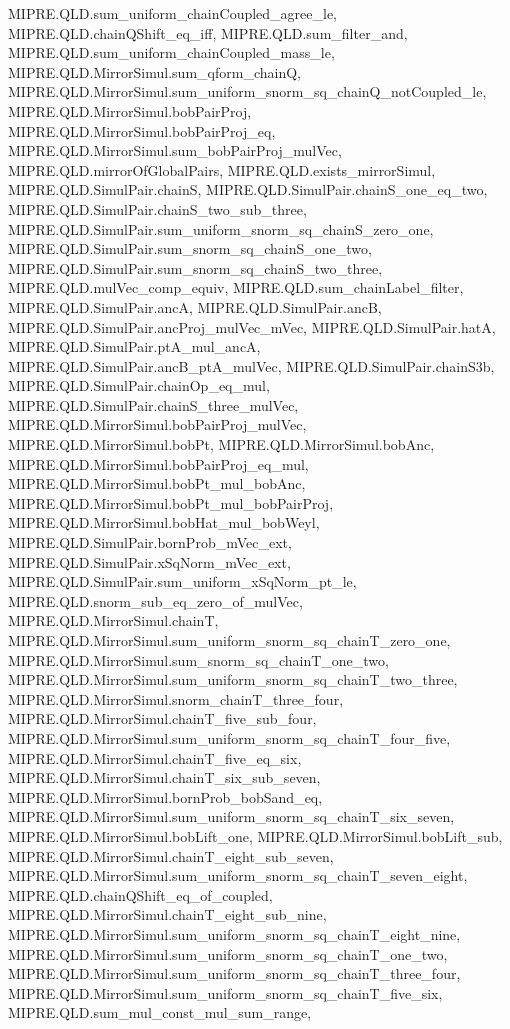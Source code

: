 \begin{lemma}
{  MIPRE.QLD.sum_uniform_chainCoupled_agree_le, MIPRE.QLD.chainQShift_eq_iff,
  MIPRE.QLD.sum_filter_and, MIPRE.QLD.sum_uniform_chainCoupled_mass_le,
  MIPRE.QLD.MirrorSimul.sum_qform_chainQ,
  MIPRE.QLD.MirrorSimul.sum_uniform_snorm_sq_chainQ_notCoupled_le,
  MIPRE.QLD.MirrorSimul.bobPairProj, MIPRE.QLD.MirrorSimul.bobPairProj_eq,
  MIPRE.QLD.MirrorSimul.sum_bobPairProj_mulVec, MIPRE.QLD.mirrorOfGlobalPairs,
  MIPRE.QLD.exists_mirrorSimul, MIPRE.QLD.SimulPair.chainS, MIPRE.QLD.SimulPair.chainS_one_eq_two,
  MIPRE.QLD.SimulPair.chainS_two_sub_three,
  MIPRE.QLD.SimulPair.sum_uniform_snorm_sq_chainS_zero_one,
  MIPRE.QLD.SimulPair.sum_snorm_sq_chainS_one_two,
  MIPRE.QLD.SimulPair.sum_snorm_sq_chainS_two_three, MIPRE.QLD.mulVec_comp_equiv,
  MIPRE.QLD.sum_chainLabel_filter, MIPRE.QLD.SimulPair.ancA, MIPRE.QLD.SimulPair.ancB,
  MIPRE.QLD.SimulPair.ancProj_mulVec_mVec, MIPRE.QLD.SimulPair.hatA,
  MIPRE.QLD.SimulPair.ptA_mul_ancA, MIPRE.QLD.SimulPair.ancB_ptA_mulVec,
  MIPRE.QLD.SimulPair.chainS3b, MIPRE.QLD.SimulPair.chainOp_eq_mul,
  MIPRE.QLD.SimulPair.chainS_three_mulVec, MIPRE.QLD.MirrorSimul.bobPairProj_mulVec,
  MIPRE.QLD.MirrorSimul.bobPt, MIPRE.QLD.MirrorSimul.bobAnc,
  MIPRE.QLD.MirrorSimul.bobPairProj_eq_mul, MIPRE.QLD.MirrorSimul.bobPt_mul_bobAnc,
  MIPRE.QLD.MirrorSimul.bobPt_mul_bobPairProj, MIPRE.QLD.MirrorSimul.bobHat_mul_bobWeyl,
  MIPRE.QLD.SimulPair.bornProb_mVec_ext, MIPRE.QLD.SimulPair.xSqNorm_mVec_ext,
  MIPRE.QLD.SimulPair.sum_uniform_xSqNorm_pt_le, MIPRE.QLD.snorm_sub_eq_zero_of_mulVec,
  MIPRE.QLD.MirrorSimul.chainT, MIPRE.QLD.MirrorSimul.sum_uniform_snorm_sq_chainT_zero_one,
  MIPRE.QLD.MirrorSimul.sum_snorm_sq_chainT_one_two,
  MIPRE.QLD.MirrorSimul.sum_uniform_snorm_sq_chainT_two_three,
  MIPRE.QLD.MirrorSimul.snorm_chainT_three_four, MIPRE.QLD.MirrorSimul.chainT_five_sub_four,
  MIPRE.QLD.MirrorSimul.sum_uniform_snorm_sq_chainT_four_five,
  MIPRE.QLD.MirrorSimul.chainT_five_eq_six, MIPRE.QLD.MirrorSimul.chainT_six_sub_seven,
  MIPRE.QLD.MirrorSimul.bornProb_bobSand_eq,
  MIPRE.QLD.MirrorSimul.sum_uniform_snorm_sq_chainT_six_seven, MIPRE.QLD.MirrorSimul.bobLift_one,
  MIPRE.QLD.MirrorSimul.bobLift_sub, MIPRE.QLD.MirrorSimul.chainT_eight_sub_seven,
  MIPRE.QLD.MirrorSimul.sum_uniform_snorm_sq_chainT_seven_eight,
  MIPRE.QLD.chainQShift_eq_of_coupled, MIPRE.QLD.MirrorSimul.chainT_eight_sub_nine,
  MIPRE.QLD.MirrorSimul.sum_uniform_snorm_sq_chainT_eight_nine,
  MIPRE.QLD.MirrorSimul.sum_uniform_snorm_sq_chainT_one_two,
  MIPRE.QLD.MirrorSimul.sum_uniform_snorm_sq_chainT_three_four,
  MIPRE.QLD.MirrorSimul.sum_uniform_snorm_sq_chainT_five_six, MIPRE.QLD.sum_mul_const_mul_sum_range,
}
\end{lemma}
